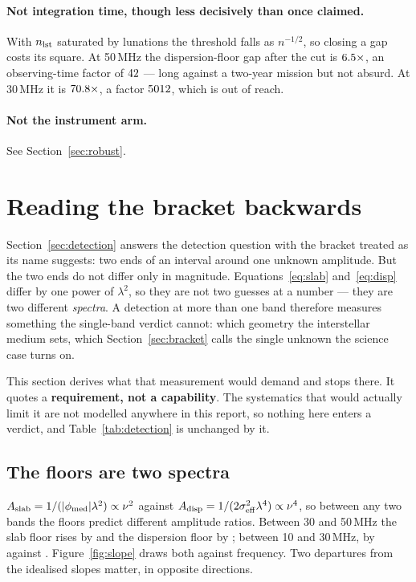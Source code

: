 \documentclass[11pt]{article}
\newcommand{\lamsq}{\ensuremath{\lambda^{2}}}
\begin{document}
\paragraph{Not integration time, though less decisively than once
claimed.} With $n_{\rm lst}$ saturated by \Lunations{} lunations the
threshold falls as $n^{-1/2}$, so closing a gap costs its square. At
50\,MHz the dispersion-floor gap after the cut is
$6.5\times$, an observing-time factor of
$42$ --- long against a two-year mission but not
absurd. At 30\,MHz it is $70.8\times$, a factor
$5012$, which is out of reach.

\paragraph{Not the instrument arm.} See Section~\ref{sec:robust}.

\section{Reading the bracket backwards}
\label{sec:backwards}

Section~\ref{sec:detection} answers the detection question with the
bracket treated as its name suggests: two ends of an interval around
one unknown amplitude. But the two ends do not differ only in
magnitude. Equations~\eqref{eq:slab} and~\eqref{eq:disp} differ by one
power of $\lamsq$, so they are not two guesses at a number --- they are
two different \emph{spectra}. A detection at more than one band
therefore measures something the single-band verdict cannot: which
geometry the interstellar medium sets, which
Section~\ref{sec:bracket} calls the single unknown the science case
turns on.

This section derives what that measurement would demand and stops
there. It quotes a \textbf{requirement, not a capability}. The
systematics that would actually limit it are not modelled anywhere in
this report, so nothing here enters a verdict, and
Table~\ref{tab:detection} is unchanged by it.

\subsection{The floors are two spectra}
\label{sec:twoslopes}

$A_{\rm slab} = 1/(|\phi_{\rm med}|\lamsq) \propto \nu^{2}$ against
$A_{\rm disp} = 1/(2\sigma_{\rm eff}^{2}\lambda^{4}) \propto \nu^{4}$,
so between any two bands the floors predict different amplitude
ratios. Between 30 and 50\,MHz the slab floor rises by
\slopeSlabFiftyThirty{} and the dispersion floor by
\slopeDispFiftyThirty; between 10 and 30\,MHz, by
\slopeSlabThirtyTen{} against \slopeDispThirtyTen.
Figure~\ref{fig:slope} draws both against frequency. Two departures
from the idealised slopes matter, in opposite directions.
\end{document}
